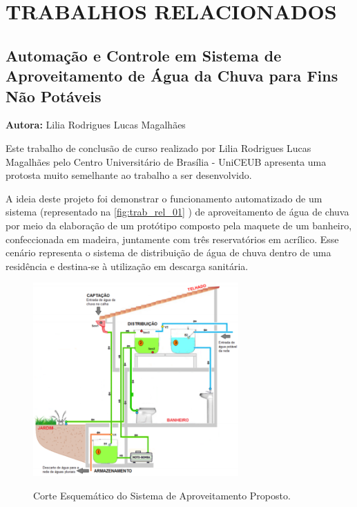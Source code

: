 
\chapter{TRABALHOS RELACIONADOS}
\label{chap:trabalhosrelacionados}

\section{Automação e Controle em Sistema de Aproveitamento de Água da Chuva para 
Fins Não Potáveis}

\textbf{Autora:} Lilia Rodrigues Lucas Magalhães
\vspace{\onelineskip}

Este trabalho de conclusão de curso realizado por Lilia Rodrigues Lucas Magalhães pelo Centro Universitário de Brasília - UniCEUB apresenta uma protosta muito semelhante ao trabalho a ser desenvolvido.

A ideia deste projeto foi demonstrar o funcionamento automatizado de um sistema (representado na \autoref{fig:trab_rel_01} ) de aproveitamento de água de chuva por meio da elaboração de um protótipo composto pela maquete de um banheiro, confeccionada em madeira, juntamente com três reservatórios em acrílico. Esse cenário representa o sistema de distribuição de água de chuva dentro de uma residência e destina-se à utilização em descarga sanitária.

\begin{figure}[H]
	\centering
	\caption{Corte Esquemático do Sistema de Aproveitamento Proposto.}
	\includegraphics[width=0.7\textwidth]{figuras/trabalhos_relacionados/fig01.png}
	\label{fig:trab_rel_01}
\end{figure}

